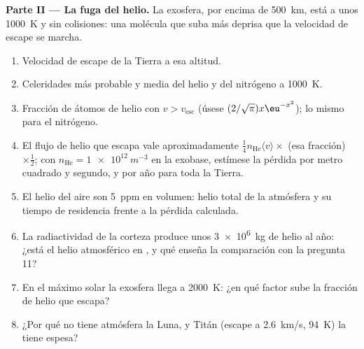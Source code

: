 \begin{problem}
\textbf{Parte II --- La fuga del helio.}
La exosfera, por encima de \qty{500}{km}, está a unos \qty{1000}{K} y
sin colisiones: una molécula que suba más deprisa que la velocidad de escape
se marcha.
\begin{enumerate}[resume]
  \item Velocidad de escape de la Tierra a esa altitud.
  \item Celeridades más probable y media del helio y del nitrógeno a
        \qty{1000}{K}.
  \item Fracción de átomos de helio con $v > v_{\text{esc}}$ (úsese
        $(2/\sqrt\pi)x\eu^{-x^2}$); lo mismo para el nitrógeno.
  \item El flujo de helio que escapa vale aproximadamente $\tfrac14n_{\text{He}}\langle
        v\rangle \times$ (esa fracción) $\times\tfrac12$; con $n_{\text{He}}
        = \qty{1e12}{m^{-3}}$ en la exobase, estímese la pérdida por metro
        cuadrado y segundo, y por año para toda la Tierra.
  \item El helio del aire son \qty{5}{ppm} en volumen: helio total de la
        atmósfera y su tiempo de residencia frente a la pérdida calculada.
  \item La radiactividad de la corteza produce unos \qty{3e6}{kg} de helio
        al año: ¿está el helio atmosférico en , y qué
        enseña la comparación con la pregunta 11?
  \item En el máximo solar la exosfera llega a \qty{2000}{K}: ¿en qué
        factor sube la fracción de helio que escapa?
  \item ¿Por qué no tiene atmósfera la Luna, y Titán (escape a
        \qty{2.6}{km/s}, \qty{94}{K}) la tiene espesa?
\end{enumerate}


\end{problem}
